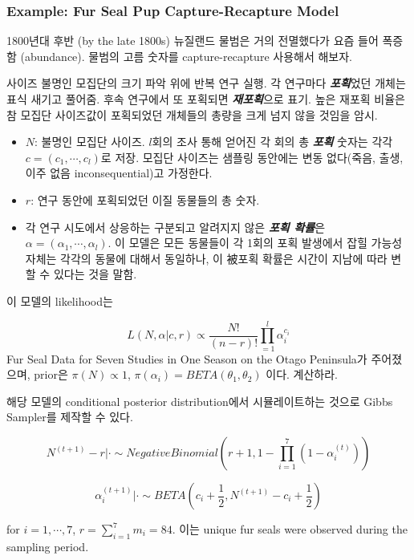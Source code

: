 \documentclass[
]{book}
\providecommand{\tightlist}{%
  \setlength{\itemsep}{0pt}\setlength{\parskip}{0pt}}
\begin{document}
\hypertarget{example-fur-seal-pup-capture-recapture-model}{%
\subsubsection{Example: Fur Seal Pup Capture-Recapture Model}\label{example-fur-seal-pup-capture-recapture-model}}

1800년대 후반 (by the late 1800s) 뉴질랜드 물범은 거의 전멸했다가 요즘 들어 폭증함 (abundance). 물범의 고름 숫자를 capture-recapture 사용해서 해보자.

사이즈 불명인 모집단의 크기 파악 위에 반복 연구 실행. 각 연구마다 \textbf{\emph{포획}}었던 개체는 표식 새기고 풀어줌. 후속 연구에서 또 포획되면 \textbf{\emph{재포획}}으로 표기. 높은 재포획 비율은 참 모집단 사이즈값이 포획되었던 개체들의 총량을 크게 넘지 않을 것임을 암시.

\begin{itemize}
\tightlist
\item
  \(N\): 불명인 모집단 사이즈. \(l\)회의 조사 통해 얻어진 각 회의 총 \textbf{\emph{포획}} 숫자는 각각 \(c=(c_1, \cdots, c_l)\)로 저장. 모집단 사이즈는 샘플링 동안에는 변동 없다(죽음, 출생, 이주 없음 inconsequential)고 가정한다.
\item
  \(r\): 연구 동안에 포획되었던 이질 동물들의 총 숫자.
\item
  각 연구 시도에서 상응하는 구분되고 알려지지 않은 \textbf{\emph{포획 확률}}은 \(\alpha = (\alpha_1 , \cdots, \alpha_l )\). 이 모델은 모든 동물들이 각 1회의 포획 발생에서 잡힐 가능성 자체는 각각의 동물에 대해서 동일하나, 이 被포획 확률은 시간이 지남에 따라 변할 수 있다는 것을 말함.
\end{itemize}

이 모델의 likelihood는

\[
L \left( N, \alpha \rvert c, r \right) 
\propto 
\dfrac {N!}{(n-r)!} \prod_{=1}^{l} \alpha_i^{c_i} 
\]
Fur Seal Data for Seven Studies in One Season on the Otago Peninsula가 주어졌으며, prior은 \(\pi(N) \propto 1\), \(\pi (\alpha_i ) = BETA(\theta_1 , \theta_2)\) 이다. 계산하라.

해당 모델의 conditional posterior distribution에서 시뮬레이트하는 것으로 Gibbs Sampler를 제작할 수 있다.

\[
N^{(t+1)}-r \rvert \cdot \sim Negative Binomial \left( r+1, 1- \prod_{i=1}^7 \left( 1- \alpha_i^{(t)} \right) \right)
\]

\[
\alpha_i^{(t+1)} \rvert \cdot \sim BETA \left( c_i + \dfrac{1}{2}, N^{(t+1)} - c_i + \dfrac{1}{2} \right)
\]

for \(i= 1, \cdots, 7\), \(r = \sum_{i=1}^7 {m_i} =84\). 이는 unique fur seals were observed during the sampling period.
\end{document}
